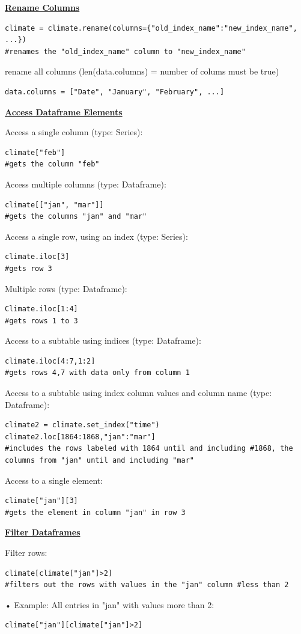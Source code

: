 {\centering\underline{\textbf{Rename Columns}} \par}
\begin{lstlisting}
climate = climate.rename(columns={"old_index_name":"new_index_name", ...})
#renames the "old_index_name" column to "new_index_name"
\end{lstlisting}
rename all columns (len(data.columns) = number of colums must be true)
\begin{lstlisting}
data.columns = ["Date", "January", "February", ...]
\end{lstlisting}

{\centering\underline{\textbf{Access Dataframe Elements}} \par}
Access a single column (type: Series):
\begin{lstlisting}
climate["feb"]
#gets the column "feb"
\end{lstlisting}
Access multiple columns (type: Dataframe):
\begin{lstlisting}
climate[["jan", "mar"]]
#gets the columns "jan" and "mar"
\end{lstlisting}
Access a single row, using an index (type: Series):
\begin{lstlisting}
climate.iloc[3]
#gets row 3
\end{lstlisting}
Multiple rows (type: Dataframe):
\begin{lstlisting}
Climate.iloc[1:4]
#gets rows 1 to 3
\end{lstlisting}
Access to a subtable using indices (type: Dataframe):
\begin{lstlisting}
climate.iloc[4:7,1:2]
#gets rows 4,7 with data only from column 1
\end{lstlisting}
Access to a subtable using index column values and column name (type: Dataframe):
\begin{lstlisting}
climate2 = climate.set_index("time")
climate2.loc[1864:1868,"jan":"mar"]
#includes the rows labeled with 1864 until and including #1868, the columns from "jan" until and including "mar"
\end{lstlisting}
Access to a single element:
\begin{lstlisting}
climate["jan"][3]
#gets the element in column "jan" in row 3
\end{lstlisting}

{\centering\underline{\textbf{Filter Dataframes}} \par}
Filter rows:
\begin{lstlisting}
climate[climate["jan"]>2]
#filters out the rows with values in the "jan" column #less than 2
\end{lstlisting}
• Example: All entries in "jan" with values more than 2:
\begin{lstlisting}
climate["jan"][climate["jan"]>2]
\end{lstlisting}


